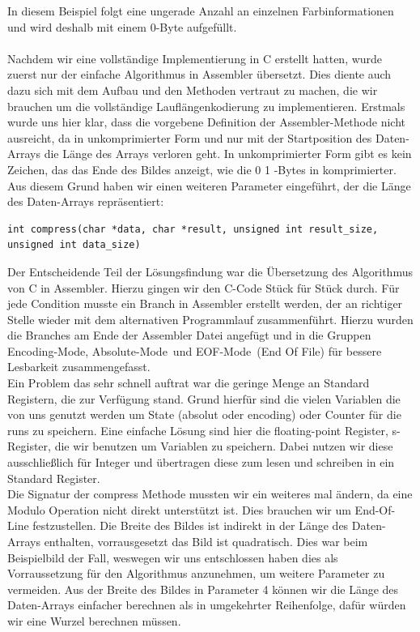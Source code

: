 \documentclass[11pt]{scrartcl}
\begin{document}
In diesem Beispiel folgt eine ungerade Anzahl an einzelnen Farbinformationen und wird deshalb mit einem 0-Byte aufgefüllt.\\
\\
Nachdem wir eine vollständige Implementierung in C erstellt hatten, wurde zuerst nur der einfache Algorithmus in Assembler übersetzt. Dies diente auch dazu sich mit dem Aufbau und den Methoden vertraut zu machen, die wir brauchen um die vollständige Lauflängenkodierung zu implementieren. Erstmals wurde uns hier klar, dass die vorgebene Definition der Assembler-Methode nicht ausreicht, da in unkomprimierter Form und nur mit der Startposition des Daten-Arrays die Länge des Arrays verloren geht. In unkomprimierter Form gibt es kein Zeichen, das das Ende des Bildes anzeigt, wie die 0 1 -Bytes in komprimierter. Aus diesem Grund haben wir einen weiteren Parameter eingeführt, der die Länge des Daten-Arrays repräsentiert:\\
\lstset{language=C, basicstyle=\small,  numbers=left, numberstyle=\tiny}
\begin{lstlisting}[caption={Neue Signatur der compress-Methode},frame=single, captionpos=b, label=code-comm-task, xleftmargin=.03\textwidth]
int compress(char *data, char *result, unsigned int result_size, unsigned int data_size)
\end{lstlisting}
Der Entscheidende Teil der Lösungsfindung war die Übersetzung des Algorithmus von C in Assembler. Hierzu gingen wir den C-Code Stück für Stück durch. Für jede Condition musste ein Branch in Assembler erstellt werden, der an richtiger Stelle wieder mit dem alternativen Programmlauf zusammenführt. Hierzu wurden die Branches am Ende der Assembler Datei angefügt und in die Gruppen \glqq Encoding-Mode\grqq , \glqq Absolute-Mode\grqq~und \glqq EOF-Mode\grqq~(End Of File) für bessere Lesbarkeit zusammengefasst.\\
Ein Problem das sehr schnell auftrat war die geringe Menge an Standard Registern, die zur Verfügung stand. Grund hierfür sind die vielen Variablen die von uns genutzt werden um State (absolut oder encoding) oder Counter für die runs zu speichern. Eine einfache Lösung sind hier die floating-point Register, s-Register, die wir benutzen um Variablen zu speichern. Dabei nutzen wir diese ausschließlich für Integer und übertragen diese zum lesen und schreiben in ein Standard Register.\\
Die Signatur der compress Methode mussten wir ein weiteres mal ändern, da eine Modulo Operation nicht direkt unterstützt ist. Dies brauchen wir um End-Of-Line festzustellen. Die Breite des Bildes ist indirekt in der Länge des Daten-Arrays enthalten, vorrausgesetzt das Bild ist quadratisch. Dies war beim Beispielbild der Fall, weswegen wir uns entschlossen haben dies als Vorraussetzung für den Algorithmus anzunehmen, um weitere Parameter zu vermeiden. Aus der Breite des Bildes in Parameter 4 können wir die Länge des Daten-Arrays einfacher berechnen als in umgekehrter Reihenfolge, dafür würden wir eine Wurzel berechnen müssen.\\
\end{document}
